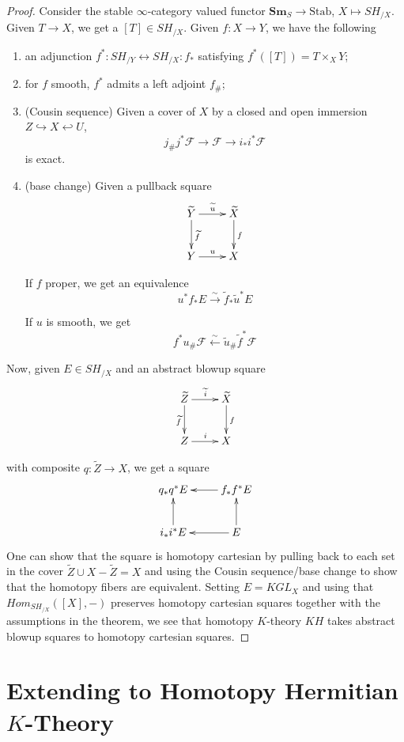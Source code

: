 \documentclass[edeposit,fullpage]{uiucthesis2009}
\newcommand{\mc}{\mathcal}
\newcommand{\Sm}[1]{\mathbf{Sm}_{#1}}
\theoremstyle{plain}
\numberwithin{lemma}{section}
\theoremstyle{definition}
\begin{document}
\begin{proof}

Consider the stable $\infty$-category valued functor $\Sm{S}
\rightarrow \mathrm{Stab}$, $X \mapsto SH_{/X}$. Given $T
\rightarrow X$, we get a $[T] \in SH_{/X}$. Given $f : X \rightarrow Y$,
we have the following
\begin{enumerate}
\item an adjunction $f^*: SH_{/Y} \leftrightarrow SH_{/X} : f_*$ satisfying
  $f^*([T]) = T \times_X Y$;
\item for $f$ smooth, $f^*$ admits a left adjoint $f_{\#}$;
\item (Cousin sequence) Given a cover of $X$ by a closed and open
  immersion $Z \hookrightarrow X \hookleftarrow U$, 
\[
j_\# j^* \mc F \rightarrow \mc F \rightarrow i_* i^* \mc F
\]
is exact.
\item (base change) Given a pullback square
\[
\xymatrix{\widetilde Y \ar[r]^{\widetilde u}\ar[d]^{\widetilde f} & \widetilde X \ar[d]^f \\ Y
  \ar[r]^u & X}
\]

If $f$ proper, we get an equivalence
\[
u^* f_* E \xrightarrow{\sim} \widetilde f_* \widetilde u^* E
\]

If $u$ is smooth, we get
\[
f^* u_\# \mc F \xleftarrow{\sim} \widetilde u_\# \widetilde f^* \mc F
\]
\end{enumerate}


Now, given $E \in SH_{/X}$ and an abstract blowup square
\[
\xymatrix{\widetilde Z \ar[r]^{\widetilde i}\ar[d]_{\widetilde f} & \widetilde X \ar[d]^f \\ Z \ar[r]^i &X}
\]

with composite $q : \widetilde Z \rightarrow X$, we get a square 
\[
\xymatrix{q_*q^* E & \ar[l] f_*f^* E \\ i_*i^*E \ar[u] & E \ar[l]\ar[u]}
\]
One can show that the
square is homotopy cartesian by pulling back to each set in the cover $\widetilde
Z \cup X-\widetilde Z = X$ and using the Cousin sequence/base change
to show that the homotopy fibers are equivalent.
Setting $E = KGL_{X}$ and using that $Hom_{SH_{/X}}([X],-)$ preserves
homotopy cartesian squares together with the assumptions in the theorem,  we see that
homotopy $K$-theory $KH$ takes abstract blowup squares to homotopy cartesian squares.
\end{proof}

\section{Extending to Homotopy Hermitian $K$-Theory}
\end{document}
